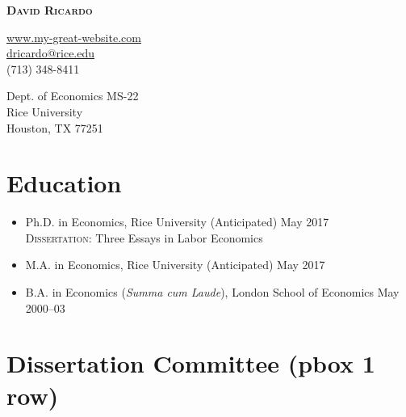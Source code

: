 \documentclass{article}[12]
\makeatletter
\newcommand{\email}[1]{\href{mailto:#1}{#1}}
\newcommand{\forceindent}{\leavevmode{\parindent=24pt\indent}}
\newcommand{\myname}{David Ricardo}
\newcommand{\myemail}{dricardo@rice.edu}
\newcommand{\mywebsite}{http://www.my-great-website.com}
\newcommand{\mywebsiteNoHttp}{www.my-great-website.com}
\newcommand{\myphone}{(713) 348-8411}
\newcommand{\myaddress}{
Dept. of Economics MS-22 \\ 
Rice University \\ 
Houston, TX 77251}
\makeatother
\begin{document}
\thispagestyle{empty}

\begin{center}
{ \bfseries\huge\scshape \myname}
\end{center}

\begin{minipage}[t]{0.48\textwidth}
    \href{\mywebsite}{\mywebsiteNoHttp} \\
    \email{\myemail}  \\ 
    \myphone 
\end{minipage}
\hfill
\begin{minipage}[t]{0.48\textwidth}
    \begin{flushright}
    \myaddress
    \end{flushright}
\end{minipage}


\section{Education}

\begin{itemize}
    \item Ph.D. in Economics, Rice University  \hfill (Anticipated) May 2017  \\
    \forceindent \textsc{Dissertation}: Three Essays in Labor Economics 

    \item M.A. in Economics, Rice University  \hfill (Anticipated) May 2017 

    \item B.A. in Economics (\emph{Summa cum Laude}), London School of Economics \hfill May 2000--03 
\end{itemize}

\section{Dissertation Committee (pbox 1 row)}

%
\hfill
%
%
%
\hfill
%
%
\end{document}
